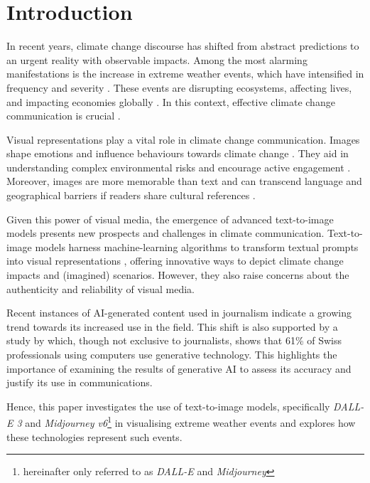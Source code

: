 \section{Introduction}

In recent years, climate change discourse has shifted from abstract predictions to an urgent reality with observable impacts. Among the most alarming manifestations is the increase in extreme weather events, which have intensified in frequency and severity \parencite{ipcc2023_wg1_11}. These events are disrupting ecosystems, affecting lives, and impacting economies globally \parencite[2460]{ipcc2023_wg2_16}. In this context, effective climate change communication is crucial \parencite{ipcc2023_wg1_1}. 

Visual representations play a vital role in climate change communication. Images shape emotions and influence behaviours towards climate change \parencite{Leiserowitz2006}. They aid in understanding complex environmental risks \parencite{Epstein1994, Joffe2008} and encourage active engagement \parencite{Keib2018}. Moreover, images are more memorable than text \parencite{Coleman2009, Graber1990} and can transcend language and geographical barriers if readers share cultural references \parencite{Armfield2013}.

Given this power of visual media, the emergence of advanced text-to-image models presents new prospects and challenges in climate communication. Text-to-image models harness machine-learning algorithms to transform textual prompts into visual representations \parencite{Zhang2023}, offering innovative ways to depict climate change impacts and (imagined) scenarios. However, they also raise concerns about the authenticity and reliability of visual media.

Recent instances of AI-generated content used in journalism \parencite{Henrich2023, Kim2023} indicate a growing trend towards its increased use in the field. This shift is also supported by a study by \textcite{Deloitte2023} which, though not exclusive to journalists, shows that 61\% of Swiss professionals using computers use generative technology. This highlights the importance of examining  the results of generative AI to assess its accuracy and justify its use in communications.

Hence, this paper investigates the use of text-to-image models, specifically \textit{DALL-E 3} and \textit{Midjourney v6}\footnote{hereinafter only referred to as \textit{DALL-E} and \textit{Midjourney}} in visualising extreme weather events and explores how these technologies represent such events.




